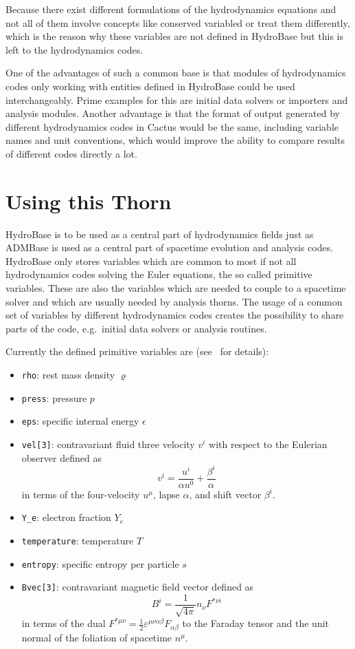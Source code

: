 Because there exist different formulations of the hydrodynamics equations and not all of
them involve concepts like conserved variabled or treat them
differently, which is the reason why these variables are not defined in HydroBase but this
is left to the hydrodynamics codes.

One of the advantages of such a common base is that modules of hydrodynamics codes only
working with entities defined in HydroBase could be used interchangeably. Prime examples
for this are initial data solvers or importers and analysis modules.
Another advantage is that the format of output generated by different hydrodynamics
codes in Cactus would be the same, including variable names and unit conventions, which
would improve the ability to compare results of different codes directly a lot.

\section{Using this Thorn}

HydroBase is to be used as a central part of hydrodynamics fields just as ADMBase is used as a 
central part of spacetime evolution and analysis codes. HydroBase only stores variables which
are common to most if not all hydrodynamics codes solving the Euler
equations, the so called primitive variables. These are also the variables which are needed
to couple to a spacetime solver and which are usually needed by analysis thorns. The usage of
a common set of variables by different hydrodynamics codes creates the possibility to share
parts of the code, e.g.\ initial data solvers or analysis routines. 

Currently the defined primitive variables are (see~\cite{livrevgrrfd} for
details):
\begin{itemize}
 \item \verb|rho|: rest mass density $\varrho$
 \item \verb|press|: pressure $p$
 \item \verb|eps|: specific internal energy $\epsilon$
 \item \verb|vel[3]|: contravariant fluid three velocity $v^i$ with respect 
to the Eulerian observer defined as
  \begin{equation}
      v^i = \frac{u^i}{\alpha u^0} + \frac{\beta^i}{\alpha}
  \end{equation}
  in terms of the four-velocity $u^\mu$, lapse $\alpha$, and shift vector
  $\beta^i$.
 \item \verb|Y_e|: electron fraction $Y_e$
 \item \verb|temperature|: temperature $T$
 \item \verb|entropy|: specific entropy per particle $s$
 \item \verb|Bvec[3]|: contravariant magnetic field vector defined as 
  \begin{equation}
      B^i = \frac{1}{\sqrt{4\pi}} n_{\nu} F^{*\nu i}
  \end{equation}
  in terms of the dual 
  $F^{*\mu\nu} = \frac{1}{2}\varepsilon^{\mu\nu\alpha\beta}F_{\alpha\beta}$ 
  to the Faraday tensor and the unit normal of the foliation of spacetime
  $n^\mu$.
\end{itemize}

